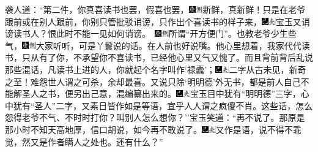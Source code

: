 袭人道：``第二件，你真喜读书也罢，假喜也罢，{\includegraphics[width=3mm]{../Images/00004}\includegraphics[width=3mm]{../Images/00011}\footnotesize \kaishu 新鲜，真新鲜！}只是在老爷跟前或在别人跟前，你别只管批驳诮谤，只作出个喜读书的样子来，{\includegraphics[width=3mm]{../Images/00003}\includegraphics[width=3mm]{../Images/00012}\footnotesize \kaishu 宝玉又诮谤读书人？恨此时不能一见如何诮谤。　{\includegraphics[width=3mm]{../Images/00004}\includegraphics[width=3mm]{../Images/00011}\footnotesize \kaishu 所谓``开方便门''。}}也教老爷少生些气，{\includegraphics[width=3mm]{../Images/00004}\includegraphics[width=3mm]{../Images/00011}\footnotesize \kaishu 大家听听，可是丫鬟说的话。}在人前也好说嘴。他心里想着，我家代代读书，只从有了你，不承望你不喜读书，已经他心里又气又愧了。而且背前背后乱说那些混话，凡读书上进的人，你就起个名字叫作`禄蠹'；{\includegraphics[width=3mm]{../Images/00003}\includegraphics[width=3mm]{../Images/00012}\footnotesize \kaishu 二字从古未见，新奇之至！难怨世人谓之可杀，余却最喜。}又说只除`明明德'外无书，都是前人自己不能解圣人之书，便另出己意，混编纂出来的。{\includegraphics[width=3mm]{../Images/00003}\includegraphics[width=3mm]{../Images/00012}\footnotesize \kaishu 宝玉目中犹有``明明德''三字，心中犹有``圣人''二字，又素日皆作如是等语，宜乎人人谓之疯傻不肖。}这些话，怎么怨得老爷不气、不时时打你？叫别人怎么想你？''宝玉笑道：``再不说了。那原是那小时不知天高地厚，信口胡说，如今再不敢说了。{\includegraphics[width=3mm]{../Images/00003}\includegraphics[width=3mm]{../Images/00012}\footnotesize \kaishu 又作是语，说不得不乖觉，然又是作者瞒人之处也。}还有什么？''

